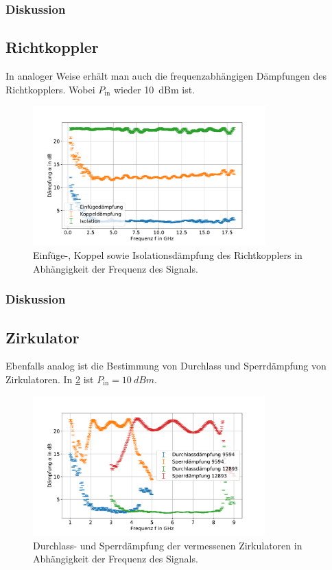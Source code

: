 \documentclass[
	a4paper,
	12pt,
	pagesize,
	ngerman
]{scrartcl}
\begin{document}
	\subsubsection*{Diskussion}

	\subsection{Richtkoppler}
	In analoger Weise erhält man auch die frequenzabhängigen Dämpfungen des Richtkopplers.
	Wobei $P_\text{in}$ wieder \SI{10}{dBm} ist.
	\begin{figure}[H]
		\includegraphics[width=0.8\textwidth]{img/richtkop}
		\centering
		\caption{
		Einfüge-, Koppel sowie Isolationsdämpfung des Richtkopplers in Abhängigkeit der Frequenz des Signals.
		}
		\label{fig_richt}
		\centering
	\end{figure}
	\subsubsection*{Diskussion}

	\subsection{Zirkulator}
	Ebenfalls analog ist die Bestimmung von Durchlass und Sperrdämpfung von Zirkulatoren.
	In \cref{fig_zirk} ist  $P_\text{in}=\SI{10}{dBm}$.
	\begin{figure}[H]
		\includegraphics[width=0.8\textwidth]{img/zirkulator}
		\centering
		\caption{
	 	Durchlass- und Sperrdämpfung der vermessenen Zirkulatoren in Abhängigkeit der Frequenz des Signals.
		}
		\label{fig_zirk}
		\centering
	\end{figure}
\end{document}
